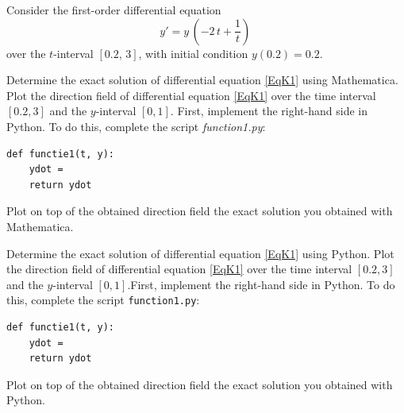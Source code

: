 \begin{Exercise} Consider the first-order differential equation
\begin{equation}\label{EqK1}
y' = y\,\left(-2\,t + \frac{1}{t}\right)\,
\end{equation}
over the $t$-interval $[0.2,\, 3]$, with initial condition $y\left(0.2\right)=0.2$.
\ifmathematica

    \Question Determine the exact solution of differential equation \eqref{EqK1} using Mathematica. %
    \Question Plot the direction field of differential equation \eqref{EqK1} over the time interval $[0.2,3]$ and the $y$-interval $[0,1]$. First, implement the right-hand side in Python. To do this, complete the script \textit{function1.py}:
\begin{lstlisting}[caption=functie1]
def functie1(t, y):
    ydot = 
    return ydot
\end{lstlisting}
    \Question Plot on top of the obtained direction field the exact solution you obtained with Mathematica.
\fi

\ifpython
    \Question Determine the exact solution of differential equation \eqref{EqK1} using Python. %
    \Question Plot the direction field of differential equation \eqref{EqK1} over the time interval $[0.2,3]$ and the $y$-interval $[0,1]$.First, implement the right-hand side in Python. To do this, complete the script \texttt{function1.py}:
\begin{lstlisting}[caption=functie1]
def functie1(t, y):
    ydot = 
    return ydot
\end{lstlisting}
    \Question Plot on top of the obtained direction field the exact solution you obtained with Python.
\fi
\end{Exercise}

